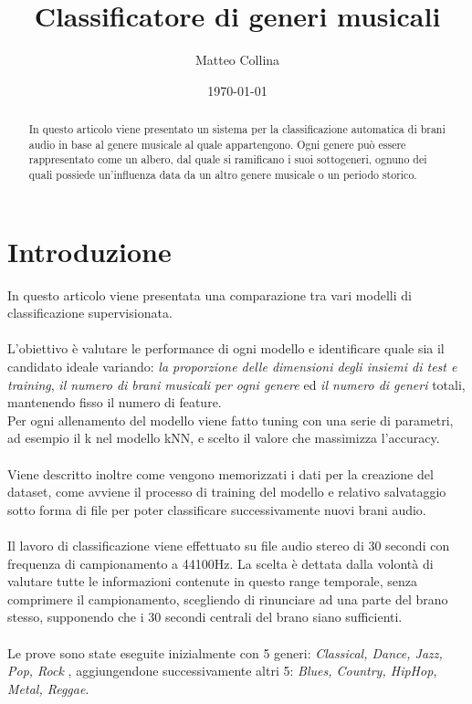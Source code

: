 \documentclass[%
 reprint,
 amsmath,amssymb,
 aps,
 article,
]{revtex4-1}
\begin{document}

\title{Classificatore di generi musicali}%

\author{Matteo Collina}

%


\date{\today}%

\begin{abstract}
In questo articolo viene presentato un sistema per la classificazione automatica di brani audio in base al genere musicale al quale appartengono. Ogni genere può essere rappresentato come un albero, dal quale si ramificano i suoi sottogeneri, ognuno dei quali possiede un’influenza data da un altro genere musicale o un periodo storico.
\end{abstract}


\maketitle


\section{\label{sec:level1}Introduzione}

In questo articolo viene presentata una comparazione tra vari modelli di classificazione supervisionata. \\\\
L'obiettivo è valutare le performance di ogni modello e identificare quale sia il candidato ideale variando: \textit{la proporzione delle dimensioni degli insiemi di test e training}, \textit{il numero di brani musicali per ogni genere} ed \textit{il numero di generi} totali, mantenendo fisso il numero di feature.\\Per ogni allenamento del modello viene fatto tuning con una serie di parametri, ad esempio il k nel modello kNN, e scelto il valore che massimizza l'accuracy. \\\\
Viene descritto inoltre come vengono memorizzati i dati per la creazione del dataset, come avviene il processo di training del modello e relativo salvataggio sotto forma di file per poter classificare successivamente nuovi brani audio. \\\\
Il lavoro di classificazione viene effettuato su file audio stereo di 30 secondi con frequenza di campionamento a 44100Hz. La scelta è dettata dalla volontà di valutare tutte le informazioni contenute in questo range temporale, senza comprimere il campionamento, scegliendo di rinunciare ad una parte del brano stesso, supponendo che i 30 secondi centrali del brano siano sufficienti. \\\\
Le prove sono state eseguite inizialmente con 5 generi: \textit{Classical, Dance, Jazz, Pop, Rock }, aggiungendone successivamente altri 5:  \textit{Blues, Country, HipHop, Metal, Reggae}.
\end{document}
